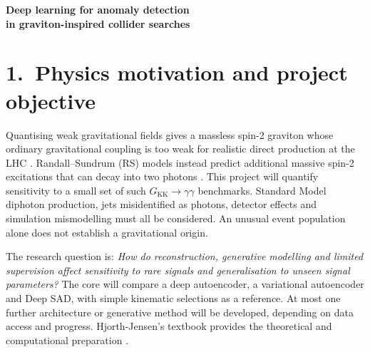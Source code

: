 \documentclass[11pt,a4paper]{article}
\begin{document}
\fontsize{10.5}{12.6}\selectfont
{\Large\bfseries\color{navy} Deep learning for anomaly detection\\in graviton-inspired collider searches\par}

\section{1.\ Physics motivation and project objective}

Quantising weak gravitational fields gives a massless spin-2 graviton
whose ordinary gravitational coupling is too weak for realistic direct
production at the LHC \cite{gravity}. Randall--Sundrum (RS) models
instead predict additional massive spin-2 excitations that can decay
into two photons \cite{rs,atlas}. This project will quantify
sensitivity to a small set of such $G_{\mathrm{KK}}\to\gamma\gamma$
benchmarks. Standard Model diphoton production, jets misidentified as
photons, detector effects and simulation mismodelling must all be
considered. An unusual event population alone does not establish a
gravitational origin.

The research question is: \emph{How do reconstruction, generative
modelling and limited supervision affect sensitivity to rare signals
and generalisation to unseen signal parameters?}  The core will
compare a deep autoencoder, a variational autoencoder and Deep SAD,
with simple kinematic selections as a reference. At most one further
architecture or generative method will be developed, depending on data
access and progress. Hjorth-Jensen's textbook provides the theoretical
and computational preparation \cite{book}.
\end{document}
